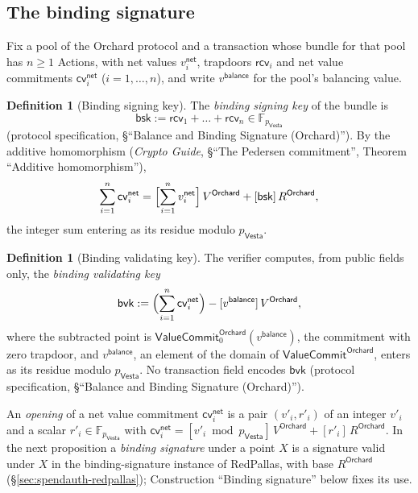 \documentclass[11pt,a4paper]{article}
\theoremstyle{definition}
\newtheorem{definition}[theorem]{Definition}
\newcommand{\F}{\mathbb{F}}
\newcommand{\cvsym}{\mathsf{cv}}
\newcommand{\Vesta}{\ensuremath{\mathsf{Vesta}}}
\newcommand{\rcv}{\ensuremath{\mathsf{rcv}}}
\begin{document}
\subsection{The binding signature}\label{sec:value-bsig}

Fix a pool of the Orchard protocol and a transaction whose bundle for that
pool has $n \ge 1$ Actions, with net values $v^{\mathsf{net}}_i$, trapdoors
$\rcv_i$ and net value commitments $\cvsym^{\mathsf{net}}_i$
($i = 1, \dots, n$), and write $v^{\mathsf{balance}}$ for the pool's
balancing value.

\begin{definition}[Binding signing key]
The \emph{binding signing key} of the bundle is
\[
  \mathsf{bsk} := \rcv_1 + \dots + \rcv_n \in \F_{p_{\Vesta}}
\]
(protocol specification, \S``Balance and Binding Signature (Orchard)''). By
the additive homomorphism (\emph{Crypto Guide}, \S``The Pedersen
commitment'', Theorem ``Additive homomorphism''),
\begin{equation}\label{eq:value-sum}
  \sum_{i=1}^{n} \cvsym^{\mathsf{net}}_i
    = \Bigl[\sum_{i=1}^{n} v^{\mathsf{net}}_i\Bigr]\,V^{\mathsf{Orchard}}
      + [\mathsf{bsk}]\,R^{\mathsf{Orchard}},
\end{equation}
the integer sum entering as its residue modulo $p_{\Vesta}$.
\end{definition}

\begin{definition}[Binding validating key]
The verifier computes, from public fields only, the \emph{binding
validating key}
\[
  \mathsf{bvk} := \Bigl(\sum_{i=1}^{n} \cvsym^{\mathsf{net}}_i\Bigr)
    - [v^{\mathsf{balance}}]\,V^{\mathsf{Orchard}},
\]
where the subtracted point is
$\mathsf{ValueCommit}^{\mathsf{Orchard}}_{0}(v^{\mathsf{balance}})$, the
commitment with zero trapdoor, and $v^{\mathsf{balance}}$, an element of the
domain of $\mathsf{ValueCommit}^{\mathsf{Orchard}}$, enters as its residue
modulo $p_{\Vesta}$. No transaction field encodes $\mathsf{bvk}$ (protocol
specification, \S``Balance and Binding Signature (Orchard)'').
\end{definition}

An \emph{opening} of a net value commitment $\cvsym^{\mathsf{net}}_i$ is a
pair $(v'_i, r'_i)$ of an integer $v'_i$ and a scalar
$r'_i \in \F_{p_{\Vesta}}$ with $\cvsym^{\mathsf{net}}_i =
[v'_i \bmod p_{\Vesta}]\,V^{\mathsf{Orchard}} + [r'_i]\,R^{\mathsf{Orchard}}$.
In the next proposition a \emph{binding signature} under a point $X$ is a
signature valid under $X$ in the binding-signature instance of RedPallas,
with base $R^{\mathsf{Orchard}}$ (\S\ref{sec:spendauth-redpallas});
Construction ``Binding signature'' below fixes its use.
\end{document}

